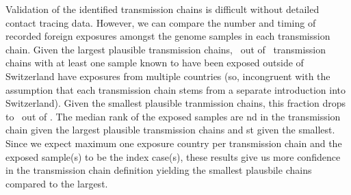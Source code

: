 \documentclass[9pt,twocolumn,twoside,lineno]{pnas-new}
\begin{document}
Validation of the identified transmission chains is difficult without detailed contact tracing data. However, we can compare the number and timing of recorded foreign exposures amongst the genome samples in each transmission chain. Given the largest plausible transmission chains, \ncinongruentexposurechainsmin\ out of \nexposurechainsmin\ transmission chains with at least one sample known to have been exposed outside of Switzerland have exposures from multiple countries (so, incongruent with the assumption that each transmission chain stems from a separate introduction into Switzerland). Given the smallest plausible tranmission chains, this fraction drops to \ncinongruentexposurechainsmax\ out of \nexposurechainsmax. The median rank of the exposed samples are  \rankexpsamplemin nd in the transmission chain given the largest plausible transmission chains and \rankexpsamplemax st given the smallest. Since we expect maximum one exposure country per transmission chain and the exposed sample(s) to be the index case(s), these results give us more confidence in the transmission chain definition yielding the smallest plausbile chains compared to the largest.

\end{document}
